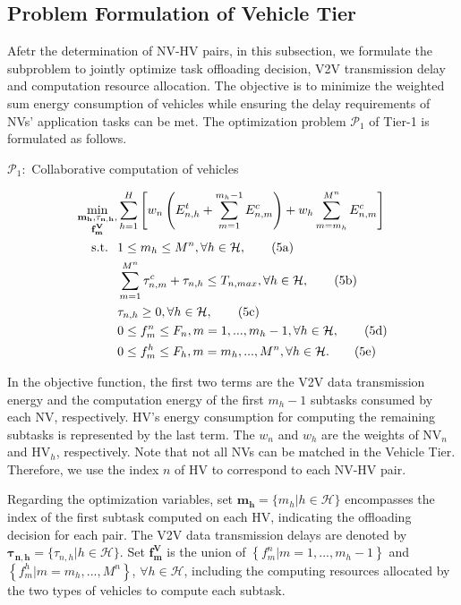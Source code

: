\documentclass[lettersize,journal]{IEEEtran}
\begin{document}
\subsection{Problem Formulation of Vehicle Tier}
Afetr the determination of NV-HV pairs, in this subsection, we formulate the subproblem to jointly optimize task offloading decision, V2V transmission delay and computation resource allocation. The objective is to minimize the weighted sum energy consumption of vehicles while ensuring the delay requirements of NVs' application tasks can be met. The optimization problem $\mathcal{P}_1$ of Tier-1 is formulated as follows.

$\mathcal{P}_1:$ Collaborative computation of vehicles

\vspace{-0.5cm}
\begin{align*}
\min _{\substack {\mathbf{m_h}, \mathbf{\tau_{n,h}},\\ \mathbf{f_m^V}}} &\sum_{h=1}^{H} \left[w_n \left ( E_{n,h}^t + \sum _{m=1}^{m_h-1} E_{n,m}^c \right) + w_h \sum_{m=m_h}^{M^n} E_{n,m}^c \right]\\
\text {s.t. } \hspace{0.1cm} &1 \leq m_h \leq M^n, \forall h \in \mathcal {H}, \tag{5a}\\
& \sum_{m=1}^{M^n} \tau_{n,m}^c +\tau_{n,h} \leq T_{n,max}, \forall h \in \mathcal {H}, \tag{5b}\\
& \tau_{n,h} \geq 0, \forall h \in \mathcal {H}, \tag{5c}\\
& 0 \leq f^n_m \leq F_n, m=1,...,m_h-1, \forall h \in \mathcal {H},\tag{5d}\\
& 0 \leq f^h_m \leq F_h, m=m_h,...,M^n, \forall h \in \mathcal {H}. \tag{5e}
\end{align*}


In the objective function, the first two terms are the V2V data transmission energy and the computation energy of the first $m_h-1$ subtasks consumed by each NV, respectively. HV's energy consumption for computing the remaining subtasks is represented by the last term. The $w_n$ and $w_h$ are the weights of NV$_n$ and HV$_h$, respectively. Note that not all NVs can be matched in the Vehicle Tier. Therefore, we use the index $n$ of HV to correspond to each NV-HV pair.

Regarding the optimization variables, set $\mathbf{m_h}=\{m_h|h \in \mathcal{H}\}$ encompasses the index of the first subtask computed on each HV, indicating the offloading decision for each pair. The V2V data transmission delays are denoted by $\mathbf{\tau_{n,h}}=\{\tau_{n,h}| h \in \mathcal{H}\}$. Set $\mathbf{f_m^V}$ is the union of $\left\{ f^n_m|m=1,...,m_h-1 \right\} $ and $ \left\{f^h_m|m=m_h,...,M^n \right\}$, $\forall h \in \mathcal{H}$, including the computing resources allocated by the two types of vehicles to compute each subtask.
\end{document}
